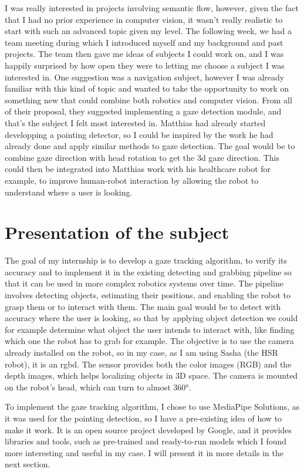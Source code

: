 I was really interested in projects involving semantic flow, however, given the fact that I had no prior experience in computer vision, it wasn't really realistic to start with such an advanced topic given my level. The following week, we had a team meeting during which I introduced myself and my background and past projects. The team then gave me ideas of subjects I could work on, and I was happily surprised by how open they were to letting me choose a subject I was interested in. One suggestion was a navigation subject, however I was already familiar with this kind of topic and wanted to take the opportunity to work on something new that could combine both robotics and computer vision. From all of their proposal, they suggested implementing a gaze detection module, and that's the subject I felt most interested in. Matthias had already started developping a pointing detector, so I could be inspired by the work he had already done and apply similar methods to gaze detection. The goal would be to combine gaze direction with head rotation to get the 3d gaze direction. This could then be integrated into Matthias work with his healthcare robot for example, to improve human-robot interaction by allowing the robot to understand where a user is looking.

\newpage
\section{Presentation of the subject}
The goal of my internship is to develop a gaze tracking algorithm, to verify its accuracy and to implement it in the existing detecting and grabbing pipeline so that it can be used in more complex robotics systems over time. The pipeline involves detecting objects, estimating their positions, and enabling the robot to grasp them or to interact with them.
The main goal would be to detect with accuracy where the user is looking, so that by applying object detection we could for example determine what object the user intends to interact with, like finding which one the robot has to grab for example. 
The objective is to use the camera already installed on the robot, so in my case, as I am using Sasha (the HSR robot), it is an \gls{rgbd}. The sensor provides both the color images (RGB) and the depth images, which helps localizing objects in 3D space. The camera is mounted on the robot's head, which can turn to almost 360°. 

To implement the gaze tracking algorithm, I chose to use MediaPipe Solutions, as it was used for the pointing detection, so I have a pre-existing idea of how to make it work. It is an open source project developed by Google, and it provides libraries and tools, such as pre-trained and ready-to-run models which I found more interesting and useful in my case. I will present it in more details in the next section.

